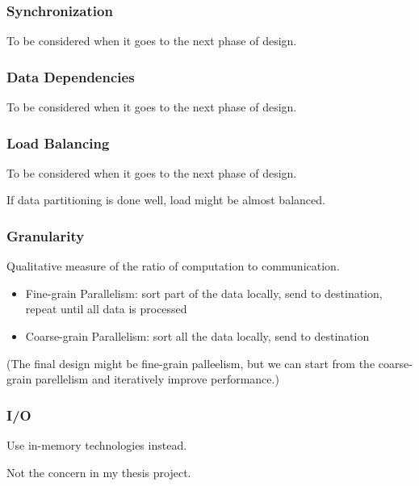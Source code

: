 \documentclass{beamer}
\begin{document}
\begin{frame}
\frametitle{Synchronization}

To be considered when it goes to the next phase of design.
  
\end{frame}

\begin{frame}
\frametitle{Data Dependencies}

To be considered when it goes to the next phase of design.
    
\end{frame}

\begin{frame}
\frametitle{Load Balancing}

To be considered when it goes to the next phase of design.

If data partitioning is done well, load might be almost balanced.
  
\end{frame}

\begin{frame}
\frametitle{Granularity}

Qualitative measure of the ratio of computation to communication.

\begin{itemize}
  \item Fine-grain Parallelism: sort part of the data locally, send to destination, repeat until all data is processed
  \item Coarse-grain Parallelism: sort all the data locally, send to destination
\end{itemize}

\alert{(The final design might be fine-grain palleelism, but we can start from the coarse-grain parellelism and iteratively improve performance.)}
    
\end{frame}

\begin{frame}
\frametitle{I/O}

Use in-memory technologies instead.

Not the concern in my thesis project.
    
\end{frame}
\end{document}
